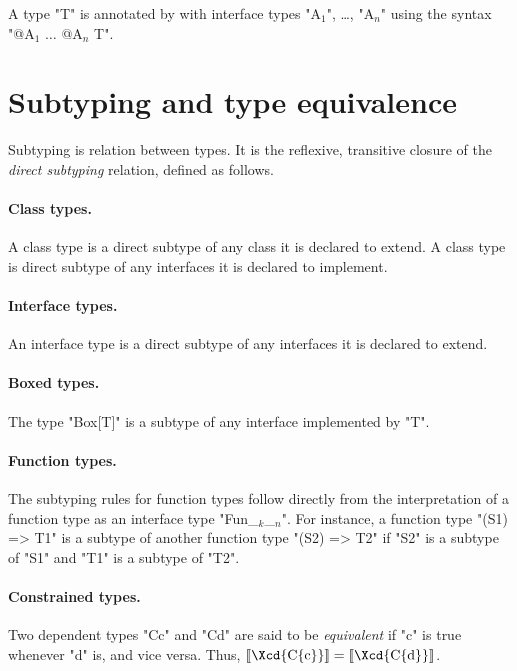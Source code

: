         A type \xcd"T" is annotated by with interface types
        \xcdmath"A$_1$", \dots,
        \xcdmath"A$_n$"
        using the syntax
        \xcdmath"@A$_1$ $\dots$ @A$_n$ T".

\section{Subtyping and type equivalence}\label{DepType:Equivalence}

Subtyping is relation between types.  It is the
reflexive, transitive 
closure of the {\em direct subtyping} relation, defined as
follows.

\paragraph{Class types.}  A class type is a direct subtype of
any
class it is declared to extend.  A class type is direct subtype
of any interfaces it is declared to implement.

\paragraph{Interface types.}  An interface type is a direct
subtype of any interfaces it is declared to extend.

\paragraph{Boxed types.}
The type \xcd"Box[T]" is a subtype of any interface implemented
by \xcd"T".

\paragraph{Function types.}

The subtyping rules for function types follow directly from the
interpretation of a function type as an interface type
\xcdmath"Fun_$_k$_$_n$".
For instance,
a function type
\xcd"(S1) => T1" 
is a subtype of another function type
\xcd"(S2) => T2" 
if \xcd"S2" is a subtype of \xcd"S1"
and \xcd"T1" is a subtype of \xcd"T2".

\paragraph{Constrained types.}

Two dependent types \xcd"C{c}" and \xcd"C{d}" are said to be {\em equivalent} if 
\xcd"c" is true whenever \xcd"d" is, and vice versa. Thus, 
$\LL{\mbox{\Xcd{C\{c\}}}} = \LL{\mbox{\Xcd{C\{d\}}}}$.


